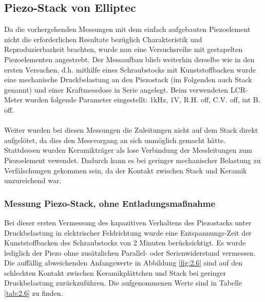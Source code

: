 \documentclass[12pt]{scrreprt} %
\begin{document}
\newpage
\subsection{Piezo-Stack von Elliptec}
Da die vorhergehenden Messungen mit dem einfach aufgebauten Piezoelement nicht die erforderlichen Resultate bezüglich Charakteristik und Reproduzierbarkeit brachten, wurde nun eine Versuchsreihe mit gestapelten Piezoelementen angestrebt. Der Messaufbau blieb weiterhin derselbe wie in den ersten Versuchen, d.h. mithilfe eines Schraubstocks mit Kunststoffbacken wurde eine mechanische Druckbelastung an den Piezostack (im Folgenden auch Stack genannt) und einer Kraftmessdose in Serie angelegt. Beim verwendeten LCR-Meter wurden folgende Parameter eingestellt: 1kHz, 1V, R.H. off, C.V. off, int B. off.\\
\\
Weiter wurden bei diesen Messungen die Zuleitungen nicht auf dem Stack direkt aufgelötet, da dies den Messvorgang an sich unmöglich gemacht hätte. Stattdessen wurden Keramikträger als lose Verbindung der Messleitungen zum Piezoelement vewendet. Dadurch kann es bei geringer mechanischer Belastung zu Verfälschungen gekommen sein, da der Kontakt zwischen Stack und Keramik unzureichend war.
\subsubsection{Messung Piezo-Stack, ohne Entladungsmaßnahme}
Bei dieser ersten Vermessung des kapazitiven Verhaltens des Piezostacks unter Druckbelastung in elektrischer Feldrichtung wurde eine Entspannungs-Zeit der Kunststoffbacken des Schraubstocks von 2 Minuten berücksichtigt. Es wurde lediglich der Piezo ohne zusätzlichen Parallel- oder Serienwiderstand vermessen. Die auffällig abweichenden Anfangswerte in Abbildung \vref{fig:2.6} sind auf den schlechten Kontakt zwischen Keramikplättchen und Stack bei geringer Druckbelastung zurückzuführen. Die aufgenommenen Werte sind in Tabelle \vref{tab:2.6} zu finden.
\end{document}

